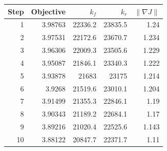 \begin{tabular}{rrrrr}
\toprule
Step & Objective & $k_f$ & $k_r$ & $\|\nabla J\|$ \\ \midrule
1 & 3.98763 & 22336.2 & 23835.5 & 1.24 \\
2 & 3.97531 & 22172.6 & 23670.7 & 1.234 \\
3 & 3.96306 & 22009.3 & 23505.6 & 1.229 \\
4 & 3.95087 & 21846.1 & 23340.3 & 1.222 \\
5 & 3.93878 & 21683 & 23175 & 1.214 \\
6 & 3.9268 & 21519.6 & 23010.1 & 1.204 \\
7 & 3.91499 & 21355.3 & 22846.1 & 1.19 \\
8 & 3.90343 & 21189.2 & 22684.1 & 1.17 \\
9 & 3.89216 & 21020.4 & 22525.6 & 1.143 \\
10 & 3.88122 & 20847.7 & 22371.7 & 1.11 \\
\bottomrule
\end{tabular}